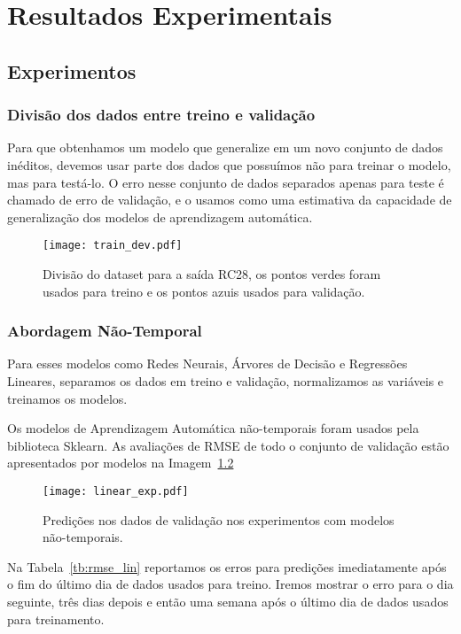 \chapter{ Resultados Experimentais }
\label{cap:resultados}
\section{Experimentos}


\subsection{Divisão dos dados entre treino e validação}

Para que obtenhamos um modelo que generalize em um novo conjunto de dados
inéditos, devemos usar parte dos dados que possuímos não para treinar o modelo,
mas para testá-lo. O erro nesse conjunto de dados separados apenas para teste é
chamado de erro de validação, e o usamos como uma estimativa da capacidade de
generalização dos modelos de aprendizagem automática.

\begin{figure}[H]
  \centering
  \texttt{[image: train\_dev.pdf]}
  \caption{Divisão do dataset para a saída RC28, os pontos verdes foram usados para
    treino e os pontos azuis usados para validação.}
  \label{fig:divrc28}
\end{figure}


\subsection{Abordagem Não-Temporal}

Para esses modelos como Redes Neurais, Árvores de Decisão e Regressões
Lineares, separamos os dados em treino e validação, normalizamos as variáveis e
treinamos os modelos. 

Os modelos de Aprendizagem Automática não-temporais foram usados pela biblioteca Sklearn.
As avaliações de RMSE de todo o conjunto de validação estão apresentados por modelos na Imagem~\ref{fig:linmodels}  

\begin{figure}[H]
  \centering
\texttt{[image: linear\_exp.pdf]}
\caption{Predições nos dados de validação nos experimentos com modelos não-temporais. }
\label{fig:linmodels}
\end{figure}

Na Tabela~\ref{tb:rmse_lin} reportamos os erros para predições imediatamente
após o fim do último dia de dados usados para treino. Iremos mostrar o
erro para o dia seguinte, três dias depois e então uma semana após o último dia
de dados usados para treinamento.


